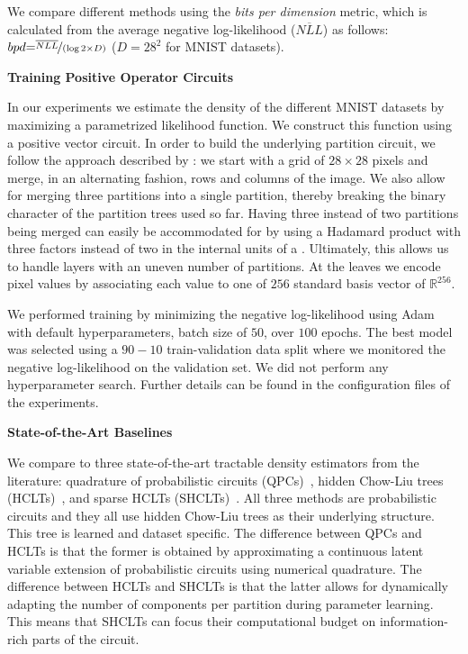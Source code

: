 We compare different methods using the \textit{bits per dimension} metric, which is calculated from the average negative log-likelihood ($\overline{NLL}$) as follows: $bpd {=} \nicefrac{\overline{NLL}}{(\log{2} \times D)}$ ($D{=}28^2$ for MNIST datasets).



\textbf{Training Positive Operator Circuits}

In our experiments we estimate the density of the different MNIST datasets by maximizing a parametrized likelihood function. We construct this  function using a positive vector circuit.
In order to build the underlying partition circuit,
we follow the approach described by \citet{zuidberg2024probabilistic}: we start with a grid of $28\times 28$ pixels and merge, in an alternating fashion, rows and columns of the image.
We also allow for merging three partitions into  a single partition, thereby breaking the binary character of the partition trees used so far.
Having three instead of two partitions being merged can easily be accommodated for by using a Hadamard product with three factors instead of two in the internal units of a \pvc. Ultimately, this allows us to handle layers with an uneven number of partitions.
At the leaves we encode pixel values by associating each value to one of $256$ standard basis vector of $\mathbb{R}^{256}$.

We performed training by minimizing the negative log-likelihood using Adam~\citep{kingma2014adam} with default hyperparameters, batch size of $50$, over $100$ epochs.
The best model was selected using a $90-10$ train-validation data split where we monitored the negative log-likelihood on the validation set.
We did not perform any hyperparameter search.
Further details can be found in the configuration files of the experiments.



\textbf{State-of-the-Art Baselines}

We compare \pvcs to three state-of-the-art tractable density estimators from the literature: quadrature of probabilistic circuits (QPCs)~\citep{gala2024probabilistic}, hidden Chow-Liu trees (HCLTs)~\citep{liu2021tractable}, and sparse HCLTs (SHCLTs)~\citep{dang2022sparse}.
All three methods are probabilistic circuits and they all use hidden Chow-Liu trees as their underlying structure. This tree is learned and dataset specific. The difference between QPCs and HCLTs is that the former is obtained by approximating a continuous latent variable extension of probabilistic circuits using numerical quadrature. The difference between HCLTs and SHCLTs is that the latter allows for dynamically adapting the number of components per partition during parameter learning. This means that SHCLTs can focus their computational budget on information-rich parts of the circuit.



